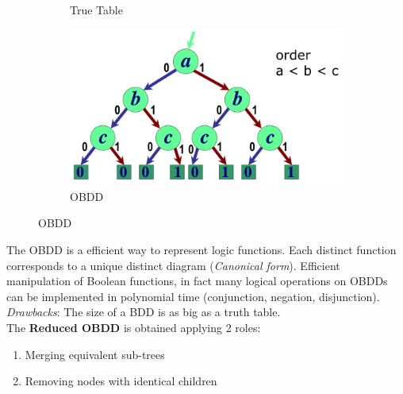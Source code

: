 \begin{figure}[H]
\begin{subfigure}[b]{0.15\textwidth}
        \caption{True Table}
        \label{fig:trueTable}
    \end{subfigure}
    \quad\quad\quad
    \begin{subfigure}[b]{0.4\textwidth}
        \includegraphics[width=\textwidth]{./Cap2/Images/Image05.png}
        \caption{OBDD}
        \label{fig:OBDD}
    \end{subfigure}
    \label{fig:OBDDs}
\end{figure}
The OBDD is a efficient way to represent logic functions. Each distinct function corresponds to a unique distinct diagram (\textit{Canonical form}). Efficient manipulation of Boolean functions, in fact many logical operations on OBDDs can be implemented in polynomial time (conjunction, negation, disjunction).\\
\textit{Drawbacks}: The size of a BDD is as big as a truth table.
\bigskip \\
The \textbf{Reduced OBDD} is obtained applying 2 roles:
\begin{enumerate}
\item Merging equivalent sub-trees
\item Removing nodes with identical children
\end{enumerate}

